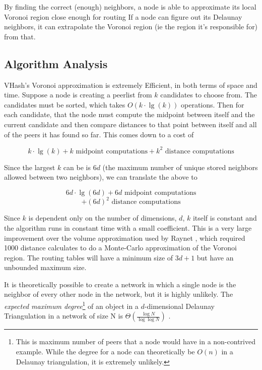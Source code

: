 \documentclass{IEEEtran}
\begin{document}
By finding the correct (enough) neighbors, a node is able to approximate its local Voronoi region close enough for routing
If a node can figure out its Delaunay neighbors, it can extrapolate the Voronoi region (ie the region it's responsible for) from that. 


\subsection{Algorithm Analysis}
VHash's Voronoi approximation is extremely Efficient, in both terms of space and time.  Suppose a node is creating a peerlist from $k$ candidates to choose from.  The candidates must be sorted, which takes $O(k\cdot\lg(k))$ operations.  Then for each candidate, that the node must compute the midpoint between itself and the current candidate and then compare distances to that point between itself and all of the peers it has found so far.  This comes down to a cost of 

\[ k\cdot\lg(k) + k \text{ midpoint computations}  + k^{2} \text{ distance computations} \]



Since the largest $k$ can be is  $6d$  (the maximum number of unique stored neighbors allowed between two neighbors), we can translate the above to

\[6d\cdot\lg(6d) + 6d \text{ midpoint computations}\]  \[+ (6d)^{2} \text{ distance computations}\]


Since $k$ is dependent only on the number of dimensions, $d$, $k$ itself is constant and the algorithm runs in constant time with a small coefficient.  This is a very large improvement over the volume approximation used by Raynet \cite{raynet}, which required 1000 distance calculates to do a Monte-Carlo approximation of the Voronoi region.  The routing tables will have a minimum size of $3d+1$ but have an unbounded maximum size. 

It is theoretically possible to create a network in which a single node is the neighbor of every other node in the network, but it is highly unlikely. The \textit{expected maximum degree}\footnote{This is maximum number of peers that a node would have in a non-contrived example.  While the degree for a node can theoretically be $O(n)$ in a Delaunay triangulation, it is extremely unlikely.}
 of an object in a $d$-dimensional Delaunay Triangulation in a network of size N is $\Theta(\frac{\log N}{\log \log N} )$ \cite{bern1991expected}. 
\end{document}
